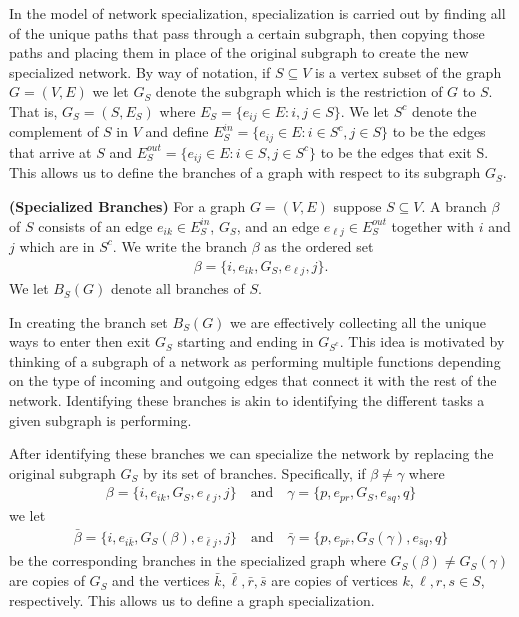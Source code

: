 \documentclass[12pt]{thesis}
\begin{document}
In the model of network specialization, specialization is carried out by finding all of the unique paths that pass through a certain subgraph, then copying those paths and placing them in place of the original subgraph to create the new specialized network.
By way of notation, if $S\subseteq V$ is a  vertex subset of the graph $G=(V,E)$ we let $G_S$ denote the subgraph which is the {restriction} of $G$ to $S$.
That is, $G_S=(S,E_S)$ where $E_S=\{e_{ij}\in E: i,j\in S\}$.
We let $S^c$ denote the {complement} of $S$ in $V$ and define $E_S^{in}=\{e_{ij}\in E: i\in S^c, j\in S\}$ to be the edges that {arrive} at $S$ and $E_S^{out}=\{e_{ij}\in E: i\in S, j\in S^c\}$ to be the edges that {exit} S.
This allows us to define the {branches} of a graph with respect to its subgraph $G_S$. 

\begin{definition}\label{def:specbranch}\textbf{(Specialized Branches)}
For a graph $G=(V,E)$ suppose $S\subseteq V$.
A {branch} $\beta$ of $S$ consists of an edge $e_{ik}\in E^{in}_S$, $G_S$, and an edge $e_{\ell j}\in E_{S}^{out}$ together with $i$ and $j$ which are in $S^c$.
We write the branch $\beta$ as the ordered set
\begin{align*}
    \beta=\{i,e_{ik},G_S,e_{\ell j},j\}.
\end{align*}
We let $B_S(G)$ denote all branches of $S$.
\end{definition}

In creating the branch set $B_S(G)$ we are effectively collecting all the unique ways to enter then exit $G_{S}$ starting and ending in $G_{S^c}$.
This idea is motivated by thinking of a subgraph of a network as performing multiple functions depending on the type of incoming and outgoing edges that connect it with the rest of the network.
Identifying these branches is akin to identifying the different tasks a given subgraph is performing. 

After identifying these branches we can specialize the network by replacing the original subgraph $G_S$ by its set of branches.
Specifically, if $\beta\neq\gamma$ where
\begin{align*}
\beta=\{i,e_{ik},G_S,e_{\ell j},j\} \quad \text{and} \quad \gamma=\{p,e_{pr},G_S,e_{sq},q\}
\end{align*}
we let
\begin{align*}
\bar{\beta}=\{i,e_{i\bar{k}},G_S(\beta),e_{\bar{\ell} j},j\} \quad \text{and} \quad \bar{\gamma}=\{p,e_{p\bar{r}},G_S(\gamma),e_{\bar{s}q},q\}
\end{align*}
be the corresponding branches in the specialized graph where $G_S(\beta) \neq G_S(\gamma)$ are copies of $G_S$ and the vertices $\bar{k},\bar{\ell},\bar{r},\bar{s}$ are copies of vertices $k,\ell,r,s\in S$, respectively.
This allows us to define a graph specialization.
\end{document}
